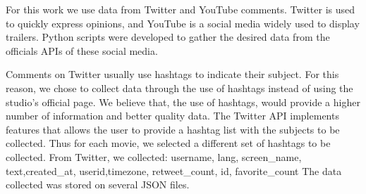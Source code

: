 



For %
this work we use data from Twitter and %
YouTube comments. Twitter is used to quickly express opinions, and YouTube is a social media widely used to display trailers. %
Python scripts were developed to gather the desired data from the officials APIs of these social media. 

Comments on Twitter usually use hashtags to indicate their subject. For this reason, we chose to collect data through the use of hashtags instead of using the studio's official page. We believe that, the use of hashtags, would provide a higher number of information and better quality data. The Twitter API implements features that allows the user to provide a hashtag list with the subjects to be collected. Thus for each movie, we selected a different set of hashtags to be collected. From Twitter, we collected: %
username, lang, screen\_name, text,created\_at, userid,timezone, retweet\_count, id, favorite\_count
The data collected was stored on several JSON files.

